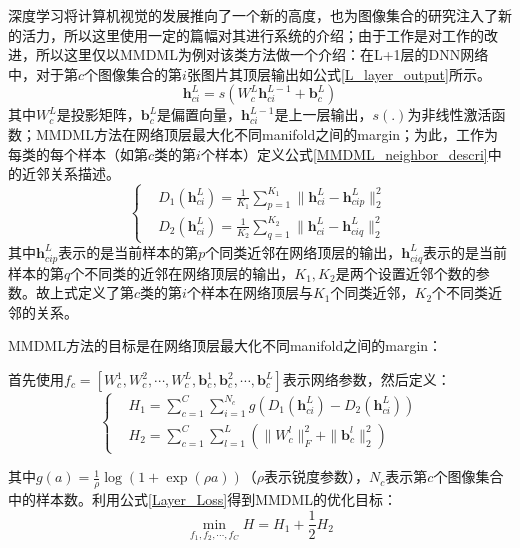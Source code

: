 深度学习将计算机视觉的发展推向了一个新的高度，也为图像集合的研究注入了新的活力，所以这里使用一定的篇幅对其进行系统的介绍；由于工作\cite{Deeplearning_MMDML}是对工作\cite{Deeplearning_DRM}的改进，所以这里仅以MMDML\cite{Deeplearning_MMDML}为例对该类方法做一个介绍：在L+1层的DNN网络中，对于第$c$个图像集合的第$i$张图片其顶层输出如公式\ref{L_layer_output}所示。
\begin{equation}
\label{L_layer_output}
\bm{h}_{ci}^{L}=s(W_{c}^{L}\bm{h}_{ci}^{L-1}+\bm{b}_{c}^{L})
\end{equation}
其中$W_c^L$是投影矩阵，$\bm{b}_c^L$是偏置向量，$\bm{h}_{ci}^{L-1}$是上一层输出，$s(.)$为非线性激活函数；MMDML\cite{Deeplearning_MMDML}方法在网络顶层最大化不同manifold之间的margin；为此，工作\cite{Deeplearning_MMDML}为每类的每个样本（如第$c$类的第$i$个样本）定义公式\ref{MMDML_neighbor_descri}中的近邻关系描述。
\begin{equation}
\label{MMDML_neighbor_descri}
\left\{
\begin{split}
&D_1 (\bm{h}_{ci}^L )=\frac{1}{K_1}\sum_{p=1}^{K_1}\|\bm{h}_{ci}^{L}-\bm{h}_{cip}^L\|_2^2\\
&D_2 (\bm{h}_{ci}^L )=\frac{1}{K_2}\sum_{q=1}^{K_2}\|\bm{h}_{ci}^L-\bm{h}_{ciq}^L\|_2^2 
\end{split}
\right.
\end{equation}
其中$\bm{h}_{cip}^L$表示的是当前样本的第$p$个同类近邻在网络顶层的输出，$\bm{h}_{ciq}^L$表示的是当前样本的第$q$个不同类的近邻在网络顶层的输出，$K_1,K_2$是两个设置近邻个数的参数。故上式定义了第$c$类的第$i$个样本在网络顶层与$K_1$个同类近邻，$K_2$个不同类近邻的关系。

MMDML方法的目标是在网络顶层最大化不同manifold之间的margin：

首先使用$f_c=[W_c^1,W_c^2,\cdots,W_c^L,\bm{b}_c^1,\bm{b}_c^2,\cdots,\bm{b}_c^L]$表示网络参数，然后定义：
\begin{equation}
\label{Layer_Loss}
\left\{
\begin{split}
&H_1=\sum_{c=1}^C\sum_{i=1}^{N_c}g(D_1(\bm{h}_{ci}^{L})-D_2(\bm{h}_{ci}^L))\\
&H_2=\sum_{c=1}^C\sum_{l=1}^L(\|W_{c}^{l}\|_{F}^{2}+\|\bm{b}_{c}^{l}\|_{2}^2)
\end{split}
\right.
\end{equation}

其中$g(a)=\frac{1}{\rho}\log(1+\exp(\rho a))$（$\rho$表示锐度参数），$N_c$表示第$c$个图像集合中的样本数。利用公式\ref{Layer_Loss}得到MMDML的优化目标：
\begin{displaymath}
\min_{f_1,f_2,\cdots,f_C }H= H_1+\frac{1}{2}H_2
\end{displaymath}

